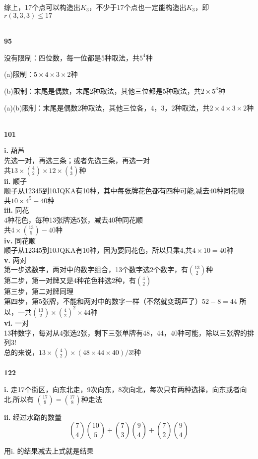 \documentclass[UTF8]{ctexart}
\begin{document}
综上，17个点可以构造出$K_3$，不少于17个点也一定能构造出$K_3$，即$r(3,3,3) \le 17$

~\\
\noindent \textbf{95}

没有限制：四位数，每一位都是5种取法，共$5^4$种

(a)限制：$5\times 4 \times 3 \times 2$种

(b)限制：末尾是偶数，末尾2种取法，其他三位都是5种取法，共$2\times 5^3$种

(a)(b)限制：末尾是偶数2种取法，其他三位各，4，3，2种取法，共$2\times 4\times 3 \times 2$种

~\\
\noindent \textbf{101}

\textbf{i. }葫芦\\
先选一对，再选三条；或者先选三条，再选一对\\
共$13\times {4\choose 2}\times 12 \times {4\choose 3}$种\\

\textbf{ii. }顺子\\
顺子从12345到10JQKA有10种，其中每张牌花色都有四种可能,减去40种同花顺\\
共$10\times 4^5-40$种\\

\textbf{iii. }同花\\
4种花色，每种13张牌选5张，减去40种同花顺\\
共$4\times {13\choose 5}-40$种\\

\textbf{iv. }同花顺\\
顺子从12345到10JQKA有10种，因为要同花色，所以只乘4,共$4\times 10=40$种\\


\textbf{v. }两对\\
第一步选数字，两对中的数字组合，13个数字选2个数字，有${13 \choose 2}$种\\
第二步，第一对牌又是4种花色种选2种，有${4\choose 2}$\\
第三步，第二对牌同理\\
第四步，第5张牌，不能和两对中的数字一样（不然就变葫芦了）$52-8=44$
所以，一共${13\choose 2}\times {4\choose 2}^2\times 44$种\\


\textbf{vi. }一对\\
13种数字，每对从4张选2张，剩下三张单牌有48，44，40种可能，除以三张牌的排列$3!$\\
总的来说，$13\times {4\choose 2}\times (48\times 44 \times 40 )/3!$种\\

~\\
\noindent \textbf{122}

\textbf{i. }走17个街区，向东北走，9次向东，8次向北，每次只有两种选择，向东或者向北,所以有
${17 \choose 9} = {17 \choose 8}$种走法

\textbf{ii. }经过水路的数量
$${7\choose 4}{10\choose 5}+{7 \choose 3}{9\choose 4}+{7\choose 2}{9 \choose 4}$$

用i. 的结果减去上式就是结果
\end{document}
